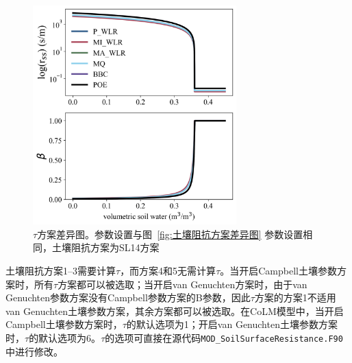 {
  \begin{figure}[htb]
    \centering
    \includegraphics[width=0.7\textwidth]{Figures/地表湍流交换过程/tau方案差异图.png}
    \caption[\(\tau\)方案差异图]{$\tau$方案差异图。参数设置与图~\ref{fig:土壤阻抗方案差异图} 参数设置相同，土壤阻抗方案为SL14方案}
    \label{fig:tau方案差异图}
  \end{figure}
}

土壤阻抗方案1--3需要计算\(\tau\)，而方案4和5无需计算\(\tau\)。当开启Campbell土壤参数方案时，所有\(\tau\)方案都可以被选取；当开启van Genuchten方案时，由于van Genuchten参数方案没有Campbell参数方案的B参数，因此\(\tau\)方案的方案1不适用van Genuchten土壤参数方案，其余方案都可以被选取。在CoLM模型中，当开启Campbell土壤参数方案时，\(\tau\)的默认选项为1；开启van Genuchten土壤参数方案时，\(\tau\)的默认选项为6。\(\tau\)的选项可直接在源代码\texttt{MOD\_SoilSurfaceResistance.F90}中进行修改。

